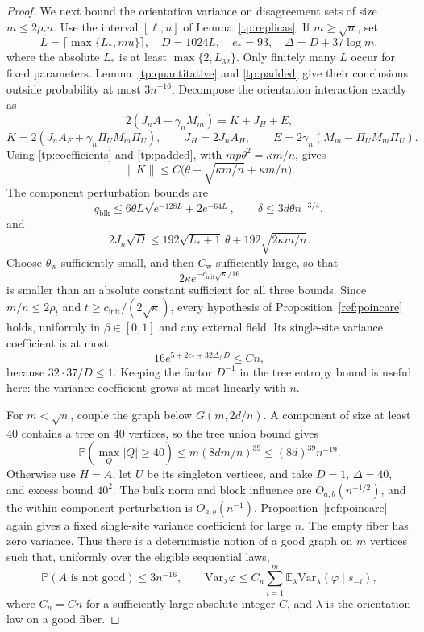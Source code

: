 \documentclass[11pt]{article}
\newcommand{\Var}{\mathrm{Var}}
\def\P{\mathbb{P}}
\def\E{\mathbb{E}}
\numberwithin{equation}{section}
\begin{document}
\begin{proof}
We next bound the orientation variance on disagreement sets of size $m\le2\rho_tn$. Use the interval $[\ell,u]$ of Lemma~\ref{tp:replicas}. If $m\ge\sqrt n$, set
\[
 L=\lceil\max\{L_*,mu\}\rceil,\quad D=1024L,
 \quad e_*=93,\quad\Delta=D+37\log m,
\]
where the absolute $L_*$ is at least $\max\{2,L_{32}\}$. Only finitely many $L$ occur for fixed parameters. Lemma~\ref{tp:quantitative} and \eqref{tp:padded} give their conclusions outside probability at most $3n^{-16}$. Decompose the orientation interaction exactly as
\[
 2(J_nA+\gamma_nM_m)=K+J_H+E,
\]
\[
 K=2(J_nA_F+\gamma_n\Pi_UM_m\Pi_U),\qquad
 J_H=2J_nA_H,\qquad E=2\gamma_n(M_m-\Pi_UM_m\Pi_U).
\]
Using \eqref{tp:coefficients} and \eqref{tp:padded}, with $mp\theta^2=\kappa m/n$, gives
\begin{equation}\label{tp:small-bulk}
 \|K\|\le C\big(\theta+\sqrt{\kappa m/n}+\kappa m/n\big).
\end{equation}
The component perturbation bounds are
\[
 q_{\mathrm{blk}}\le6\theta L\sqrt{e^{-128L}+2e^{-64L}},\qquad
 \delta\le3d\theta n^{-3/4},
\]
and
\[
 2J_n\sqrt D\le192\sqrt{L_*+1}\,\theta
                  +192\sqrt{2\kappa m/n}.
\]
Choose $\theta_{\mathrm w}$ sufficiently small, and then $C_{\mathrm w}$ sufficiently large, so that
\[
 2\kappa e^{-c_{\mathrm{init}}\sqrt\kappa/16}
\]
is smaller than an absolute constant sufficient for all three bounds. Since $m/n\le2\rho_t$ and $t\ge c_{\mathrm{init}}/(2\sqrt\kappa)$, every hypothesis of Proposition~\ref{ref:poincare} holds, uniformly in $\beta\in[0,1]$ and any external field. Its single-site variance coefficient is at most
\[
 16e^{5+2e_*+32\Delta/D}\le C n,
\]
because $32\cdot37/D\le1$. Keeping the factor $D^{-1}$ in the tree entropy bound is useful here: the variance coefficient grows at most linearly with $n$.

For $m<\sqrt n$, couple the graph below $G(m,2d/n)$. A component of size at least $40$ contains a tree on $40$ vertices, so the tree union bound gives
\[
 \P(\max_Q|Q|\ge40)\le m(8dm/n)^{39}\le(8d)^{39}n^{-19}.
\]
Otherwise use $H=A$, let $U$ be its singleton vertices, and take $D=1$, $\Delta=40$, and excess bound $40^2$. The bulk norm and block influence are $O_{a,b}(n^{-1/2})$, and the within-component perturbation is $O_{a,b}(n^{-1})$. Proposition~\ref{ref:poincare} again gives a fixed single-site variance coefficient for large $n$. The empty fiber has zero variance. Thus there is a deterministic notion of a good graph on $m$ vertices such that, uniformly over the eligible sequential laws,
\begin{equation}\label{tp:good-fiber}
 \P(A\text{ is not good})\le3n^{-16},
 \qquad \Var_\lambda\varphi\le C_n\sum_{i=1}^m
       \E_\lambda\Var_\lambda(\varphi\mid s_{-i}),
\end{equation}
where $C_n=Cn$ for a sufficiently large absolute integer $C$, and $\lambda$ is the orientation law on a good fiber.


\end{proof}
\end{document}
